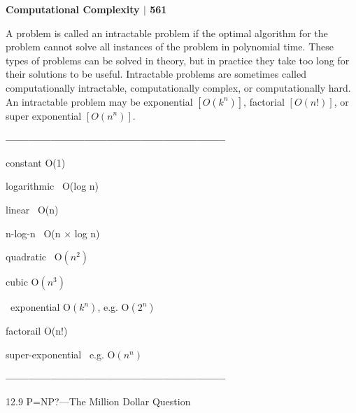 \documentclass[10pt,a4paper]{book}
\begin{document}
\small

\begin{flushright}
  \textsf{\textbf{Computational Complexity $|$ 561}}
\end{flushright}

A problem is called an intractable problem if the optimal algorithm for the problem cannot solve all
instances of the problem in polynomial time. These types of problems can be solved in theory, but in
practice they take too long for their solutions to be useful. Intractable problems are sometimes called
computationally intractable, computationally complex, or computationally hard. An intractable problem
may be exponential $[O(k^{n})]$, factorial $[O(n!)]$, or super exponential $[O(n^{n})]$.

\qquad

\begin{center}
\textsf{\textbf{-----------------------------------------------------------}}

\!\!\!\!\!\!\!\!\!constant \qquad\qquad\qquad  O(1)

logarithmic \qquad\qquad\;\, O(log n)

\!\!\!\!\!\!\!\!\!linear \qquad\qquad\qquad\;\;\;\, O(n)

\qquad n-log-n \qquad\qquad\qquad\;\, O(n × log n)

\!\!\!\!\!quadratic \qquad\qquad\quad\;\, O$(n^{2})$

\!\!\!\!\!cubic \qquad\qquad\qquad\quad\; O$(n^{3})$

\qquad\qquad\, exponential \qquad\qquad\quad O$(k^{n})$, e.g. O$(2^{n})$

\!\!\!\!\!factorail \qquad\qquad\qquad O(n!)

\quad super-exponential \qquad\, e.g. O$(n^{n})$

\textsf{\textbf{-----------------------------------------------------------}}
\end{center}

\qquad

\begin{flushleft}
  \large 12.9 \; \textsf{P=NP?---The Million Dollar Question}
\end{flushleft}
\end{document}
